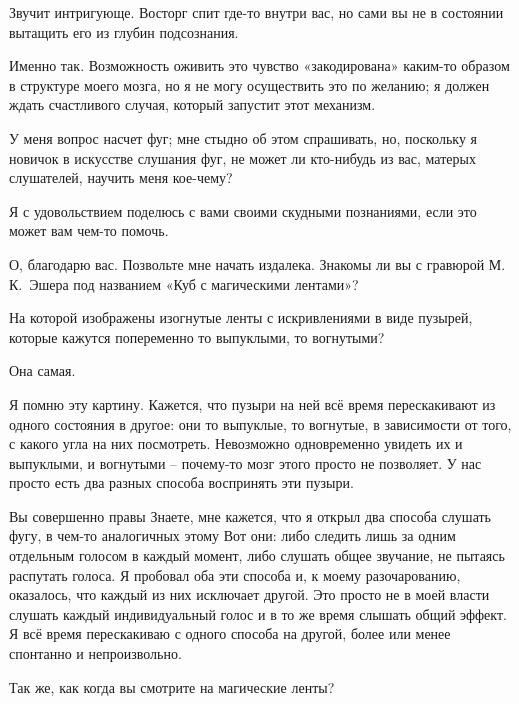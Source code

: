 \documentclass[../main.tex]{subfiles}
\begin{document}
\begin{dialogue}
 Звучит интригующе. Восторг спит где-то внутри вас, но сами вы не в состоянии вытащить его из глубин подсознания.

 Именно так. Возможность оживить это чувство «закодирована» каким-то образом в структуре моего мозга, но я не могу осуществить это по желанию; я должен ждать счастливого случая, который запустит этот механизм.

 У меня вопрос насчет фуг; мне стыдно об этом спрашивать, но, поскольку я новичок в искусстве слушания фуг, не может ли кто-нибудь из вас, матерых слушателей, научить меня кое-чему?

 Я с удовольствием поделюсь с вами своими скудными познаниями, если это может вам чем-то помочь.

 О, благодарю вас. Позвольте мне начать издалека. Знакомы ли вы с гравюрой М.\,К.~Эшера под названием «Куб с магическими лентами»?


 На которой изображены изогнутые ленты с искривлениями в виде пузырей, которые кажутся попеременно то выпуклыми, то вогнутыми?

 Она самая.

 Я помню эту картину. Кажется, что пузыри на ней всё время перескакивают из одного состояния в другое: они то выпуклые, то вогнутые, в зависимости от того, с какого угла на них посмотреть. Невозможно одновременно увидеть их и выпуклыми, и вогнутыми \--- почему-то мозг этого просто не позволяет. У нас просто есть два разных способа воспринять эти пузыри.

 Вы совершенно правы Знаете, мне кажется, что я открыл два способа слушать фугу, в чем-то аналогичных этому Вот они: либо следить лишь за одним отдельным голосом в каждый момент, либо слушать общее звучание, не пытаясь распутать голоса. Я пробовал оба эти способа и, к моему разочарованию, оказалось, что каждый из них исключает другой. Это просто не в моей власти слушать каждый индивидуальный голос и в то же время слышать общий эффект. Я всё время перескакиваю с одного способа на другой, более или менее спонтанно и непроизвольно.

 Так же, как когда вы смотрите на магические ленты?


\end{dialogue}
\end{document}
